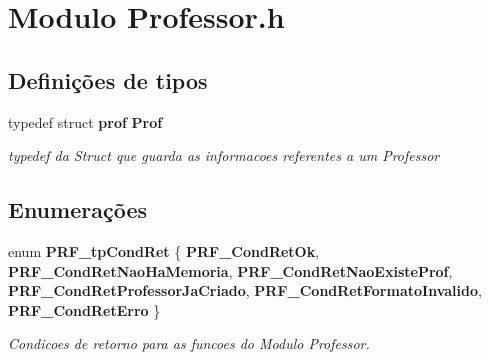 \section{Modulo Professor.\+h}
\label{group__modulo_professor}
\subsection*{Definições de tipos}
\begin{DoxyCompactItemize}
\item 
\mbox{\label{group__modulo_professor_ga916da98a108102b3104185629371b6a7}} 
typedef struct \textbf{ prof} \textbf{ Prof}
\begin{DoxyCompactList}\small\item\em typedef da Struct que guarda as informacoes referentes a um Professor \end{DoxyCompactList}\end{DoxyCompactItemize}
\subsection*{Enumerações}
\begin{DoxyCompactItemize}
\item 
enum \textbf{ P\+R\+F\+\_\+tp\+Cond\+Ret} \{ \newline
\textbf{ P\+R\+F\+\_\+\+Cond\+Ret\+Ok}, 
\textbf{ P\+R\+F\+\_\+\+Cond\+Ret\+Nao\+Ha\+Memoria}, 
\textbf{ P\+R\+F\+\_\+\+Cond\+Ret\+Nao\+Existe\+Prof}, 
\textbf{ P\+R\+F\+\_\+\+Cond\+Ret\+Professor\+Ja\+Criado}, 
\newline
\textbf{ P\+R\+F\+\_\+\+Cond\+Ret\+Formato\+Invalido}, 
\textbf{ P\+R\+F\+\_\+\+Cond\+Ret\+Erro}
 \}\begin{DoxyCompactList}\small\item\em Condicoes de retorno para as funcoes do Modulo Professor. \end{DoxyCompactList}
\end{DoxyCompactItemize}
